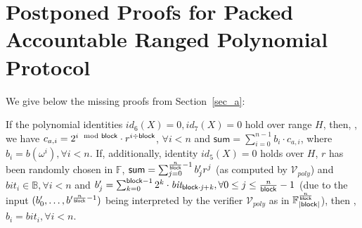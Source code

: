 \section{Postponed Proofs for Packed Accountable Ranged Polynomial Protocol}
\label{sec:missing_snark_proofs}

\noindent We give below the missing proofs from Section~\ref{sec_a}:

\begin{test_claim}
\label{claim:bitvector_comm}
If the polynomial identities $id_6(X) = 0, id_7(X) = 0$ hold over range $H$, then, 
\ewnp, 
we have $c_{a,i} =  2^{i \mod {\mathsf{block}}} \cdot r^{i \div \mathsf{block}}$, $\forall i < n$ and $\mathsf{sum} = \sum_{i=0}^{n-1}b_i \cdot c_{a,i}$, 
where $b_i = b(\omega^i), \forall i <n$. If, additionally, identity $id_5(X) = 0$ holds over $H$, 
$r$ has been randomly chosen in $\mathbb{F}$, $\mathsf{sum} = \sum_{j=0}^{\frac{n}{\mathsf{block}}-1} b'_{j}r^j$ 
(as computed by $\mathcal{V}_{poly}$) and $\mathit{bit_{i}} \in \mathbb{B}, \forall i < n$ and 
$b'_{j} = \sum_{k=0}^{\mathsf{block} -1}2^k \cdot \mathit{bit_{\mathsf{block} \cdot j + k}}, \forall 0 \leq j \leq \frac{n}{\mathsf{block}} -1$ 
(due to the input $(b'_{0}, \ldots, b'^{\frac{n}{\mathsf{block}} -1})$ 
being interpreted by the verifier $\mathcal{V}_{poly}$ as in $\mathbb{F}_{|\mathsf{block}|}^{\frac{n}{\mathsf{block}}}$), then \ewnp, 
$b_i = \mathit{bit_{i}}, \forall i <n$.
\end{test_claim}

